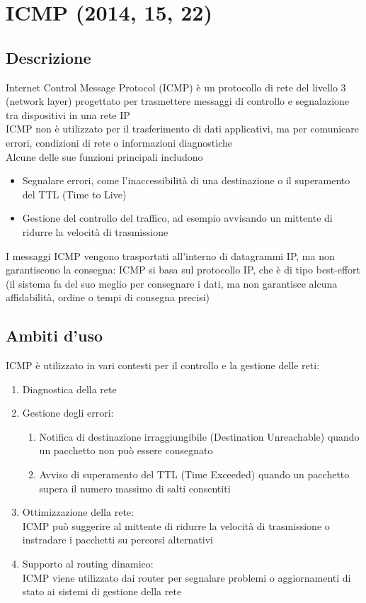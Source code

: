 \documentclass[10pt,oneside,a4paper]{article}
\begin{document}
\section{ICMP (2014, 15, 22)}
\subsection{Descrizione}
Internet Control Message Protocol (ICMP) è un protocollo di rete del livello 3 (network layer) progettato per trasmettere messaggi di controllo e segnalazione tra dispositivi in una rete IP\\
ICMP non è utilizzato per il trasferimento di dati applicativi, ma per comunicare errori, condizioni di rete o informazioni diagnostiche\\
Alcune delle sue funzioni principali includono
\begin{itemize}
\item Segnalare errori, come l'inaccessibilità di una destinazione o il superamento del TTL (Time to Live)
\item Gestione del controllo del traffico, ad esempio avvisando un mittente di ridurre la velocità di trasmissione
\end{itemize}
I messaggi ICMP vengono trasportati all'interno di datagrammi IP, ma non garantiscono la consegna: ICMP si basa sul protocollo IP, che è di tipo best-effort (il sistema fa del suo meglio per consegnare i dati, ma non garantisce alcuna affidabilità, ordine o tempi di consegna precisi)
\subsection{Ambiti d'uso}
ICMP è utilizzato in vari contesti per il controllo e la gestione delle reti:
\begin{enumerate}
\item Diagnostica della rete
\item Gestione degli errori:
\begin{enumerate}
\item Notifica di destinazione irraggiungibile (Destination Unreachable) quando un pacchetto non può essere consegnato
\item Avviso di superamento del TTL (Time Exceeded) quando un pacchetto supera il numero massimo di salti consentiti
\end{enumerate}
\item Ottimizzazione della rete:\\
ICMP può suggerire al mittente di ridurre la velocità di trasmissione o instradare i pacchetti su percorsi alternativi
\item Supporto al routing dinamico:\\
ICMP viene utilizzato dai router per segnalare problemi o aggiornamenti di stato ai sistemi di gestione della rete
\end{enumerate}
\end{document}
